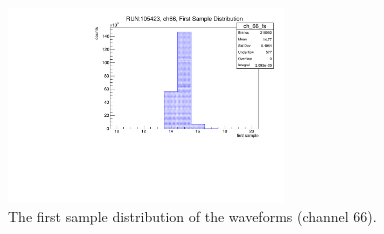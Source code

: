 \begin{figure}[!h]
  \centering
  \includegraphics[width=0.65\textwidth]{figures/pdf/fs.pdf}
  \caption[The first sample distribution of the waveforms.]{The first sample distribution of the waveforms (channel 66).}
  \label{fig:fs2}
\end{figure}

